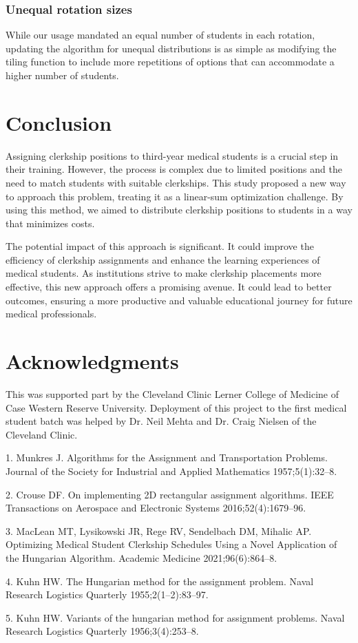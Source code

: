 \documentclass{article}
\begin{document}
\subsubsection{Unequal rotation sizes}
While our usage mandated an equal number of students in each rotation, updating the algorithm for unequal distributions is as simple as modifying the tiling function to include more repetitions of options that can accommodate a higher number of students. 

\section{Conclusion}
Assigning clerkship positions to third-year medical students is a crucial step in their training. However, the process is complex due to limited positions and the need to match students with suitable clerkships. This study proposed a new way to approach this problem, treating it as a linear-sum optimization challenge. By using this method, we aimed to distribute clerkship positions to students in a way that minimizes costs.

The potential impact of this approach is significant. It could improve the efficiency of clerkship assignments and enhance the learning experiences of medical students. As institutions strive to make clerkship placements more effective, this new approach offers a promising avenue. It could lead to better outcomes, ensuring a more productive and valuable educational journey for future medical professionals.

\section*{Acknowledgments}
This was supported part by the Cleveland Clinic Lerner College of Medicine of Case Western Reserve University. Deployment of this project to the first medical student batch was helped by Dr. Neil Mehta and Dr. Craig Nielsen of the Cleveland Clinic.

  

1.  Munkres J. Algorithms for the Assignment and Transportation Problems. Journal of the Society for Industrial and Applied Mathematics 1957;5(1):32–8. 

2.  Crouse DF. On implementing 2D rectangular assignment algorithms. IEEE Transactions on Aerospace and Electronic Systems 2016;52(4):1679–96. 

3.  MacLean MT, Lysikowski JR, Rege RV, Sendelbach DM, Mihalic AP. Optimizing Medical Student Clerkship Schedules Using a Novel Application of the Hungarian Algorithm. Academic Medicine 2021;96(6):864–8. 

4.  Kuhn HW. The Hungarian method for the assignment problem. Naval Research Logistics Quarterly 1955;2(1–2):83–97. 

5.  Kuhn HW. Variants of the hungarian method for assignment problems. Naval Research Logistics Quarterly 1956;3(4):253–8. 
\end{document}
